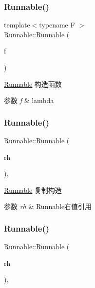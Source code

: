 \subsubsection{\texorpdfstring{Runnable()}{Runnable()}\hspace{0.1cm}{\footnotesize\ttfamily [1/3]}}
{\footnotesize\ttfamily template$<$typename F $>$ \\
Runnable\+::\+Runnable (\begin{DoxyParamCaption}\item[{F \&\&}]{f }\end{DoxyParamCaption})\hspace{0.3cm}{\ttfamily [inline]}}



\hyperlink{classRunnable}{Runnable} 构造函数 


\begin{DoxyParams}{参数}
{\em f} & lambda \\
\hline
\end{DoxyParams}
\mbox{\label{classRunnable_a6d6ce997a7873530a2f339412e6c4935}} 
\subsubsection{\texorpdfstring{Runnable()}{Runnable()}\hspace{0.1cm}{\footnotesize\ttfamily [2/3]}}
{\footnotesize\ttfamily Runnable\+::\+Runnable (\begin{DoxyParamCaption}\item[{\hyperlink{classRunnable}{Runnable} \&\&}]{rh }\end{DoxyParamCaption})\hspace{0.3cm}{\ttfamily [inline]}, {\ttfamily [explicit]}}



\hyperlink{classRunnable}{Runnable} 复制构造 


\begin{DoxyParams}{参数}
{\em rh} & Runnable右值引用 \\
\hline
\end{DoxyParams}
\mbox{\label{classRunnable_a9e4d88b5d30d6e0368c5d22a0df203ee}} 
\subsubsection{\texorpdfstring{Runnable()}{Runnable()}\hspace{0.1cm}{\footnotesize\ttfamily [3/3]}}
{\footnotesize\ttfamily Runnable\+::\+Runnable (\begin{DoxyParamCaption}\item[{\hyperlink{classRunnable}{Runnable} \&}]{rh }\end{DoxyParamCaption})\hspace{0.3cm}{\ttfamily [inline]}, {\ttfamily [explicit]}}



